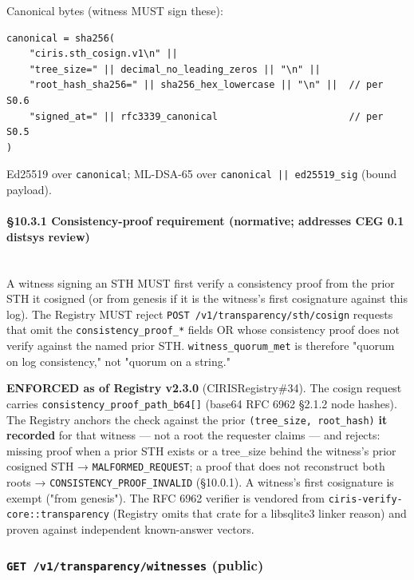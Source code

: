 \documentclass[10pt]{article}
\begin{document}
Canonical bytes (witness MUST sign these):


\begin{lstlisting}
canonical = sha256(
    "ciris.sth_cosign.v1\n" ||
    "tree_size=" || decimal_no_leading_zeros || "\n" ||
    "root_hash_sha256=" || sha256_hex_lowercase || "\n" ||  // per S0.6
    "signed_at=" || rfc3339_canonical                       // per S0.5
)
\end{lstlisting}

Ed25519 over \texttt{canonical}; ML-DSA-65 over \texttt{canonical || ed25519\_sig} (bound payload).


\paragraph{§10.3.1 Consistency-proof requirement (normative; addresses CEG 0.1 distsys review)}\mbox{}\\


A witness signing an STH MUST first verify a consistency proof from the prior STH it cosigned (or from genesis if it is the witness's first cosignature against this log). The Registry MUST reject \texttt{POST /v1/transparency/sth/cosign} requests that omit the \texttt{consistency\_proof\_*} fields OR whose consistency proof does not verify against the named prior STH. \texttt{witness\_quorum\_met} is therefore "quorum on log consistency," not "quorum on a string."


\textbf{ENFORCED as of Registry v2.3.0} (CIRISRegistry\#34). The cosign request carries \texttt{consistency\_proof\_path\_b64[]} (base64 RFC 6962 §2.1.2 node hashes). The Registry anchors the check against the prior \texttt{(tree\_size, root\_hash)} \textbf{it recorded} for that witness — not a root the requester claims — and rejects: missing proof when a prior STH exists or a tree\_size behind the witness's prior cosigned STH → \texttt{MALFORMED\_REQUEST}; a proof that does not reconstruct both roots → \texttt{CONSISTENCY\_PROOF\_INVALID} (§10.0.1). A witness's first cosignature is exempt ("from genesis"). The RFC 6962 verifier is vendored from \texttt{ciris-verify-core::transparency} (Registry omits that crate for a libsqlite3 linker reason) and proven against independent known-answer vectors.


\subsubsection*{\texttt{GET /v1/transparency/witnesses} (public)}
\end{document}
